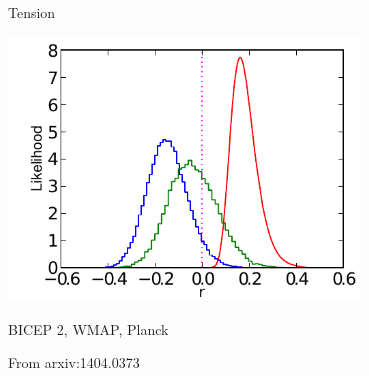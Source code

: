 \documentclass{beamer}
\begin{document}
\begin{frame}{Tension}
	\begin{center}
		\includegraphics[height=7cm]{tension.pdf}

		{\color{red}BICEP 2}, {\color[rgb]{0,0.5,0}WMAP}, {\color{blue}Planck}

		{\footnotesize From arxiv:1404.0373}
	\end{center}
\end{frame}
\end{document}
